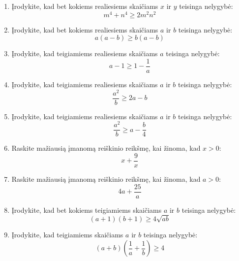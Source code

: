 \documentclass[11pt,a4paper]{scrartcl}
\begin{document}
\begin{enumerate}
    \renewcommand{\labelenumi}{\textbf{\theenumi.}}

    \item Įrodykite, kad bet kokiems realiesiems skaičiams $x$ ir $y$ teisinga nelygybė:
    $$ m^4 + n^4 \ge 2m ^{2} n ^{2}  $$

    \item Įrodykite, kad bet kokiems realiesiems skaičiams $a$ ir $b$ teisinga nelygybė:
    $$ a(a-b) \ge b(a-b) $$

    \item Įrodykite, kad teigiamiems realiesiems skaičiams $a$ teisinga nelygybė:
    $$ a - 1 \ge 1 - \frac{1}{a} $$

    \item Įrodykite, kad teigiamiems realiesiems skaičiams $a$ ir $b$ teisinga nelygybė:
    $$ \frac{a^2}{b} \ge 2a - b $$

    \item Įrodykite, kad teigiamiems realiesiems skaičiams $a$ ir $b$ teisinga nelygybė:
    $$ \frac{a^2}{b} \ge a - \frac{b}{4} $$

    \item Raskite mažiausią įmanomą reiškinio reikšmę, kai žinoma, kad $x > 0$:
    $$ x + \frac{9}{x} $$

    \item Raskite mažiausią įmanomą reiškinio reikšmę, kai žinoma, kad $a > 0$:
    $$ 4a + \frac{25}{a} $$

    \item Įrodykite, kad bet kokiems teigiamiems skaičiams $a$ ir $b$ teisinga nelygybė:
    $$ (a+1)(b+1) \ge 4\sqrt{ab} $$

    \item Įrodykite, kad teigiamiems skaičiams $a$ ir $b$ teisinga nelygybė:
    $$ (a+b)\left(\frac{1}{a}+\frac{1}{b}\right) \ge 4 $$
\end{enumerate}
\end{document}
